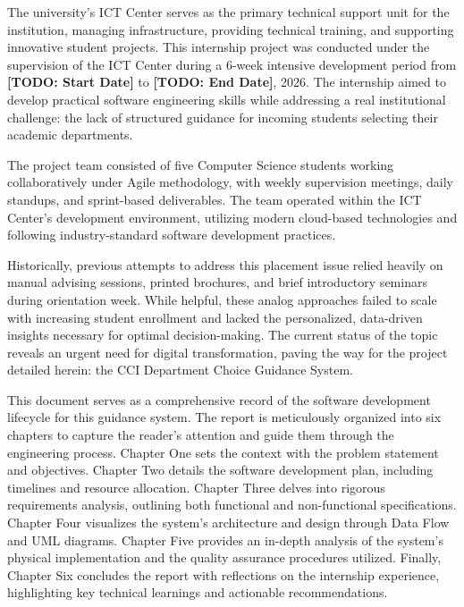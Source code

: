\documentclass[12pt, a4paper]{article}
\newcommand{\TODO}[1]{\textcolor{placeholdercolor}{\textbf{[TODO: #1]}}}
\begin{document}
The university's ICT Center serves as the primary technical support unit for the institution, managing infrastructure, providing technical training, and supporting innovative student projects. This internship project was conducted under the supervision of the ICT Center during a 6-week intensive development period from \TODO{Start Date} to \TODO{End Date}, 2026. The internship aimed to develop practical software engineering skills while addressing a real institutional challenge: the lack of structured guidance for incoming students selecting their academic departments.

The project team consisted of five Computer Science students working collaboratively under Agile methodology, with weekly supervision meetings, daily standups, and sprint-based deliverables. The team operated within the ICT Center's development environment, utilizing modern cloud-based technologies and following industry-standard software development practices.


Historically, previous attempts to address this placement issue relied heavily on manual advising sessions, printed brochures, and brief introductory seminars during orientation week. While helpful, these analog approaches failed to scale with increasing student enrollment and lacked the personalized, data-driven insights necessary for optimal decision-making. The current status of the topic reveals an urgent need for digital transformation, paving the way for the project detailed herein: the CCI Department Choice Guidance System.

This document serves as a comprehensive record of the software development lifecycle for this guidance system. The report is meticulously organized into six chapters to capture the reader's attention and guide them through the engineering process. Chapter One sets the context with the problem statement and objectives. Chapter Two details the software development plan, including timelines and resource allocation. Chapter Three delves into rigorous requirements analysis, outlining both functional and non-functional specifications. Chapter Four visualizes the system's architecture and design through Data Flow and UML diagrams. Chapter Five provides an in-depth analysis of the system's physical implementation and the quality assurance procedures utilized. Finally, Chapter Six concludes the report with reflections on the internship experience, highlighting key technical learnings and actionable recommendations.


\end{document}
